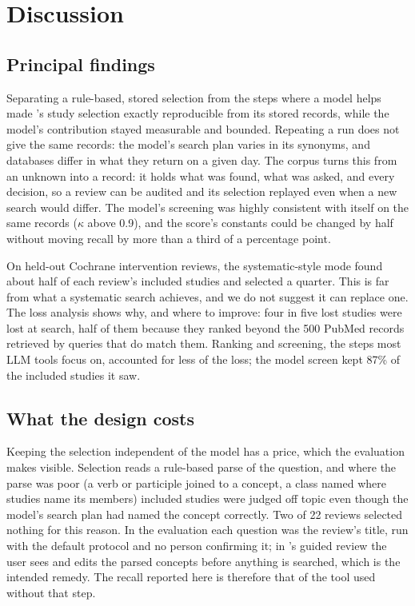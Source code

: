 \section{Discussion}
\label{sec:discussion}

\subsection{Principal findings}

Separating a rule-based, stored selection from the steps where a model helps made \tool{}'s study selection exactly
reproducible from its stored records, while the model's contribution stayed measurable and bounded. Repeating a run
does not give the same records: the model's search plan varies in its synonyms, and databases differ in what they
return on a given day. The corpus turns this from an unknown into a record: it holds what was found, what was
asked, and every decision, so a review can be audited and its selection replayed even when a new search would
differ. The model's screening was highly consistent with itself on the same records ($\kappa$ above 0.9), and the
score's constants could be changed by half without moving recall by more than a third of a percentage point.

On held-out Cochrane intervention reviews, the systematic-style mode found about half of each review's included
studies and selected a quarter. This is far from what a systematic search achieves, and we do not suggest it can
replace one. The loss analysis shows why, and where to improve: four in five lost studies were lost at search, half
of them because they ranked beyond the 500 PubMed records retrieved by queries that do match them. Ranking and
screening, the steps most LLM tools focus on, accounted for less of the loss; the model screen kept 87\% of the
included studies it saw.

\subsection{What the design costs}

Keeping the selection independent of the model has a price, which the evaluation makes visible. Selection reads a
rule-based parse of the question, and where the parse was poor (a verb or participle joined to a concept, a class
named where studies name its members) included studies were judged off topic even though the model's search plan
had named the concept correctly. Two of 22 reviews selected nothing for this reason. In the evaluation each question
was the review's title, run with the default protocol and no person confirming it; in \tool{}'s guided review the
user sees and edits the parsed concepts before anything is searched, which is the intended remedy. The recall
reported here is therefore that of the tool used without that step.

